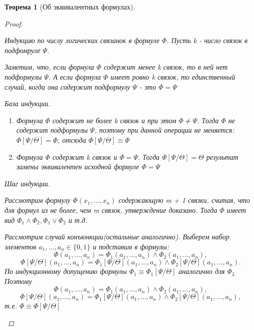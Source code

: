 \documentclass[a4paper]{article}
\newtheorem{theorem}{Теорема}[section]
\theoremstyle{definition}
\theoremstyle{remark}
\begin{document}
\begin{theorem}[Об эквивалентных формулах]
\begin{proof}
\begin{enumerate}
				Индукцию по числу логических связанок в формуле $\Phi$. Пусть k - число связок в подфомруле $\Psi$.

				Заметим, что, если формула $\Phi$ содержит менее k связок, то в ней нет подформулы $\Psi$. А если формула $\Phi$ имеет ровно k связок, то единственный случай, когда она содержит подформулу $\Psi$ - это $\Phi = \Psi$

				База индукции. 
				
				\begin{enumerate}
					\item Формула $\Phi$ содержит не более k связок и при этом $\Phi \neq \Psi$. Тогда $\Phi$ не содержит подформулы $\Psi$, поэтому при данной операции не меняется: $\Phi[\Psi/\Theta] = \Phi$, отсюда $\Phi[\Psi/\Theta] \equiv \Phi$
					\item Формула $\Phi$ содержит k связок и $\Phi = \Psi$. Тогда $\Phi[\Psi/\Theta] = \Theta$ результат замены эквивалентен исходной формуле $\Phi = \Psi$
				\end{enumerate}

				Шаг индукции.

				Рассмотрим формулу $\Phi(x_1, \dots , x_n)$ содержающую m + 1 связки, считая, что для формул из не более, чем m связок, утверждение доказано. Тогда $\Phi$  имеет вид $\Phi_1 \wedge \Phi_2, \Phi_1 \vee \Phi_2$ и т.д.

				Рассмотрим случай конъюнкции(остальные аналогично). Выберем набор элементов $a_1, \dots , a_n \in \{0, 1\}$ и подставим в формулы: $$\Phi(a_1, \dots , a_n) = \Phi_1(a_1, \dots , a_n) \wedge \Phi_2(a_1, \dots , a_n),$$
				$$\Phi[\Psi/\Theta](a_1, \dots , a_n) = \Phi_1[\Psi/\Theta](a_1, \dots , a_n) \wedge \Phi_2[\Psi/\Theta](a_1, \dots , a_n).$$
				По индукционному допущению формулы $\Phi_1 \equiv \Phi_1[\Psi/\Theta]$ аналогично для $\Phi_2$ Поэтому $$\Phi(a_1, \dots , a_n) = \Phi_1(a_1, \dots , a_n) \wedge \Phi_2(a_1, \dots  , a_n),$$
				$$\Phi[\Psi/\Theta](a_1, \dots , a_n) = \Phi_1[\Psi/\Theta](a_1, \dots , a_n) \wedge \Phi_2[\Psi/\Theta](a_1, \dots , a_n),$$ т.е. $\Phi \equiv \Phi[\Psi/\Theta]$
		\end{enumerate}
	\end{proof}
    \end{theorem}
\end{document}
